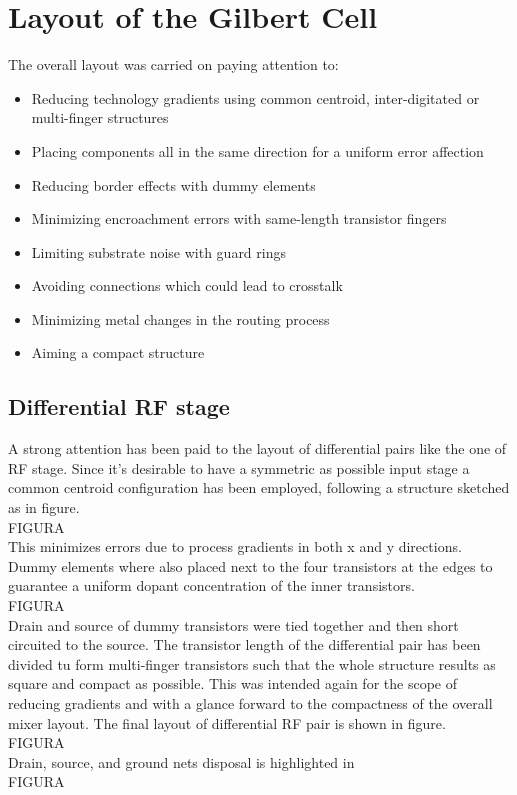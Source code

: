 \section{Layout of the Gilbert Cell}
The overall layout was carried on paying attention to:
\begin{itemize}
	\item Reducing technology gradients using common centroid, inter-digitated or multi-finger structures
	\item Placing components all in the same direction for a uniform error affection
	\item Reducing border effects with dummy elements
	\item Minimizing encroachment errors with same-length transistor fingers
 	\item Limiting substrate noise with guard rings
	\item Avoiding connections which could lead to crosstalk
	\item Minimizing metal changes in the routing process
	\item Aiming a compact structure
\end{itemize}
\subsection{Differential RF stage}
A strong attention has been paid to the layout of differential pairs like the one of RF stage. Since it's desirable to have a symmetric as possible input stage a common centroid configuration has been employed, following a structure sketched as in figure. \\FIGURA\\
This minimizes errors due to process gradients in both x and y directions. Dummy elements where also placed next to the four transistors at the edges to guarantee a uniform dopant concentration of the inner transistors. \\FIGURA\\ Drain and source of dummy transistors were tied together and then short circuited to the source.
The transistor length of the differential pair has been divided tu form multi-finger  transistors such that the whole structure results as square and compact as possible. This was intended again for the scope of reducing gradients and with a glance forward to the compactness of the overall mixer layout. The final layout of differential RF pair is shown in figure. \\FIGURA\\ Drain, source, and ground nets disposal is highlighted in \\FIGURA\\

